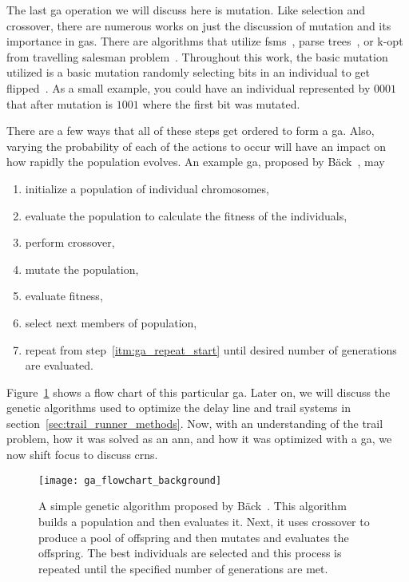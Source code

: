 The last \gls{ga} operation we will discuss here is mutation. Like selection and crossover, there are numerous works on just the discussion of mutation and its importance in \Glspl{ga}. There are algorithms that utilize \glspl{fsm}~\cite{Baeck2000-co}, parse trees~\cite{Angeline1996-no}, or k-opt from travelling salesman problem~\cite{Lin1973-tp}. Throughout this work, the basic mutation utilized is a basic mutation randomly selecting bits in an individual to get flipped~\cite{Mitchell1998-tw}. As a small example, you could have an individual represented by $0001$ that after mutation is $1001$ where the first bit was mutated.

There are a few ways that all of these steps get ordered to form a \gls{ga}. Also, varying the probability of each of the actions to occur will have an impact on how rapidly the population evolves. An example \gls{ga}, proposed by B\"{a}ck~\cite{Baeck2000-co}, may

\begin{enumerate}
\item initialize a population of individual chromosomes,
\item evaluate the population to calculate the fitness of the individuals,
\item \label{itm:ga_repeat_start} perform crossover,
\item mutate the population,
\item evaluate fitness,
\item select next members of population,
\item repeat from step~\ref{itm:ga_repeat_start} until desired number of generations are evaluated.
\end{enumerate}

Figure~\ref{fig:ga_flowchart_background} shows a flow chart of this particular \gls{ga}. Later on, we will discuss the genetic algorithms used to optimize the delay line and trail systems in section~\ref{sec:trail_runner_methods}. Now, with an understanding of the trail problem, how it was solved as an \gls{ann}, and how it was optimized with a \gls{ga}, we now shift focus to discuss \glspl{crn}. 

\begin{figure}
\centering
\texttt{[image: ga\_flowchart\_background]}
\caption[B\"{a}ck Simple Genetic Algorithm]{A simple genetic algorithm proposed by B\"{a}ck~\cite{Baeck2000-co}. This algorithm builds a population and then evaluates it. Next, it uses crossover to produce a pool of offspring and then mutates and evaluates the offspring. The best individuals are selected and this process is repeated until the specified number of generations are met.}
\label{fig:ga_flowchart_background}
\end{figure}

